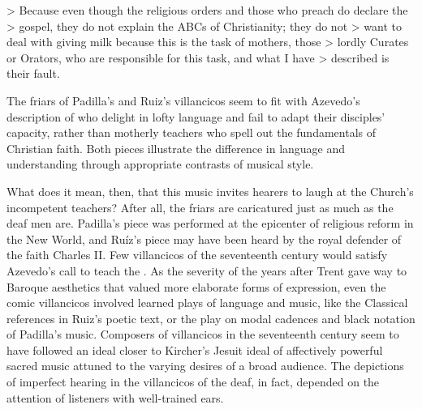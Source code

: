> Because even though the religious orders and those who preach do declare the > gospel, they do not explain the ABCs  of Christianity; they do not > want to deal with giving milk because this is the task of mothers, those > lordly Curates or Orators, who are responsible for this task, and what I have > described is their fault.
\Autocite[27:  .]{Azevedo:Catecismo}

The friars of Padilla's and Ruiz's villancicos seem to fit with Azevedo's description of  who delight in lofty language and fail to adapt their disciples' capacity, rather than motherly teachers who spell out the fundamentals of Christian faith.
Both pieces illustrate the difference in language and understanding through appropriate contrasts of musical style.

What does it mean, then, that this music invites hearers to laugh at the Church's incompetent teachers? After all, the friars are caricatured just as much as the deaf men are.
Padilla's piece was performed at the epicenter of religious reform in the New World, and Ruíz's piece may have been heard by the royal defender of the faith Charles II.  %
Few villancicos of the seventeenth century would satisfy Azevedo's call to teach the .
As the severity of the years after Trent gave way to Baroque aesthetics that valued more elaborate forms of expression, even the comic villancicos involved learned plays of language and music, like the Classical references in Ruiz's poetic text, or the play on modal cadences and black notation of Padilla's music.
Composers of villancicos in the seventeenth century seem to have followed an ideal closer to Kircher's Jesuit ideal of affectively powerful sacred music attuned to the varying desires of a broad audience.
The depictions of imperfect hearing in the villancicos of the deaf, in fact, depended on the attention of listeners with well-trained ears.



